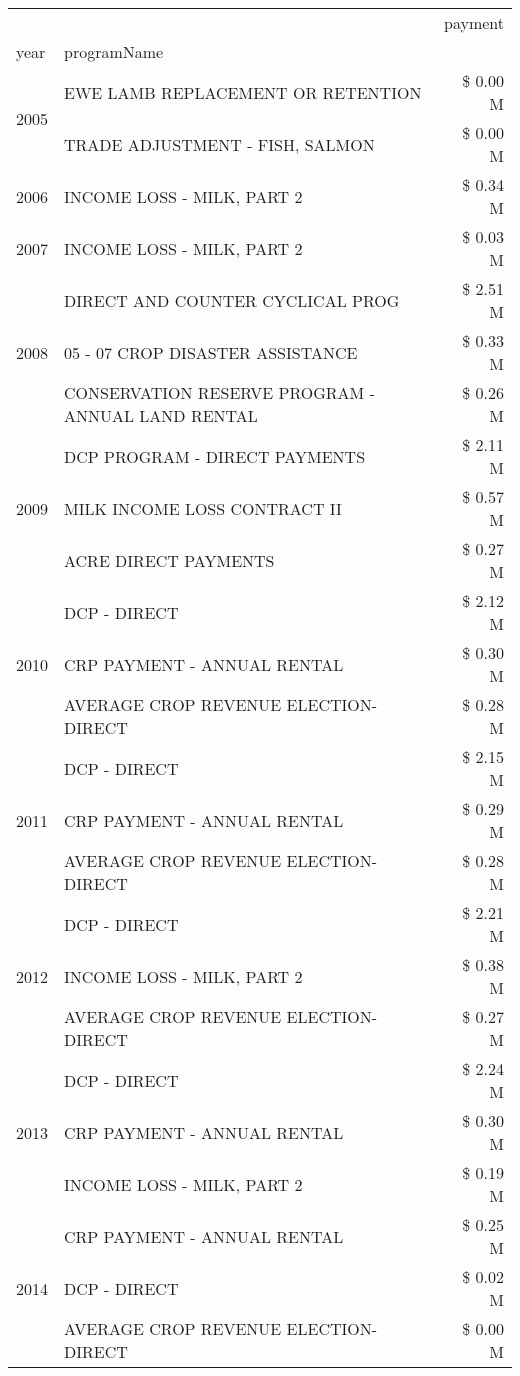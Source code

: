 \begin{tabular}{llr}
\toprule
 &  & payment \\
year & programName &  \\
\midrule
\multirow[t]{2}{*}{2005} & EWE LAMB REPLACEMENT OR RETENTION & \$ 0.00 M \\
 & TRADE ADJUSTMENT - FISH, SALMON & \$ 0.00 M \\
\cline{1-3}
2006 & INCOME LOSS - MILK, PART 2 & \$ 0.34 M \\
\cline{1-3}
2007 & INCOME LOSS - MILK, PART 2 & \$ 0.03 M \\
\cline{1-3}
\multirow[t]{3}{*}{2008} & DIRECT AND COUNTER CYCLICAL PROG & \$ 2.51 M \\
 & 05 - 07 CROP DISASTER ASSISTANCE & \$ 0.33 M \\
 & CONSERVATION RESERVE PROGRAM - ANNUAL LAND RENTAL & \$ 0.26 M \\
\cline{1-3}
\multirow[t]{3}{*}{2009} & DCP PROGRAM - DIRECT PAYMENTS & \$ 2.11 M \\
 & MILK INCOME LOSS CONTRACT II & \$ 0.57 M \\
 & ACRE DIRECT PAYMENTS & \$ 0.27 M \\
\cline{1-3}
\multirow[t]{3}{*}{2010} & DCP - DIRECT & \$ 2.12 M \\
 & CRP PAYMENT - ANNUAL RENTAL & \$ 0.30 M \\
 & AVERAGE CROP REVENUE ELECTION-DIRECT & \$ 0.28 M \\
\cline{1-3}
\multirow[t]{3}{*}{2011} & DCP - DIRECT & \$ 2.15 M \\
 & CRP PAYMENT - ANNUAL RENTAL & \$ 0.29 M \\
 & AVERAGE CROP REVENUE ELECTION-DIRECT & \$ 0.28 M \\
\cline{1-3}
\multirow[t]{3}{*}{2012} & DCP - DIRECT & \$ 2.21 M \\
 & INCOME LOSS - MILK, PART 2 & \$ 0.38 M \\
 & AVERAGE CROP REVENUE ELECTION-DIRECT & \$ 0.27 M \\
\cline{1-3}
\multirow[t]{3}{*}{2013} & DCP - DIRECT & \$ 2.24 M \\
 & CRP PAYMENT - ANNUAL RENTAL & \$ 0.30 M \\
 & INCOME LOSS - MILK, PART 2 & \$ 0.19 M \\
\cline{1-3}
\multirow[t]{3}{*}{2014} & CRP PAYMENT - ANNUAL RENTAL & \$ 0.25 M \\
 & DCP - DIRECT & \$ 0.02 M \\
 & AVERAGE CROP REVENUE ELECTION-DIRECT & \$ 0.00 M \\

\end{tabular}

